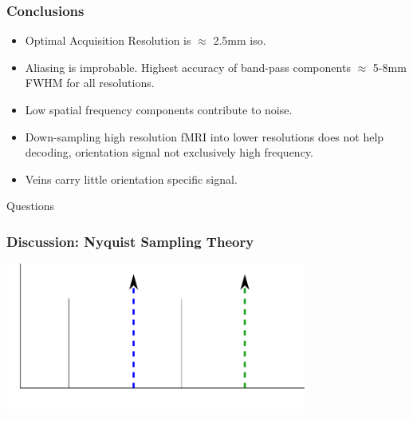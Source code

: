 \documentclass{beamer}
\begin{document}
  \begin{frame}
    \frametitle{Conclusions}
        \begin{center}
        \begin{itemize}
         \item Optimal Acquisition Resolution is $\approx$ 2.5mm iso.
         \item Aliasing is improbable. Highest accuracy of band-pass 
         components $\approx$ 5-8mm FWHM for all resolutions.
         \item Low spatial frequency components contribute to noise.
         \item Down-sampling high resolution fMRI into lower resolutions 
         does not help decoding, orientation signal not exclusively high frequency.
         \item Veins carry little orientation specific signal.
        \end{itemize}  
        \end{center}
    \end{frame} 

  \begin{frame}
        \begin{center}
            Questions
        \end{center}
    \end{frame} 
    
  \begin{frame}
    \frametitle{Discussion: Nyquist Sampling Theory}
        \begin{center}
            \includegraphics[height=5cm]{pics/nyquist}
        \end{center}
    \end{frame}                        
\end{document}
